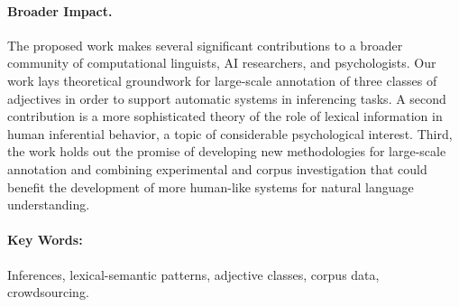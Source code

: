 \documentclass[10pt]{article}
\begin{document}
\paragraph{Broader Impact.}
The proposed work  makes several significant contributions to a broader community of computational linguists, AI researchers, and psychologists. 
Our work lays theoretical groundwork for large-scale annotation of three classes of adjectives in order to support automatic systems in inferencing tasks. 
A second contribution is a more sophisticated theory of the role of lexical information in human inferential behavior, a topic of considerable psychological interest.
Third, the work holds out the promise of developing new methodologies for large-scale annotation and combining experimental and corpus investigation that could benefit the development of more human-like systems for natural language understanding.


\vspace{-1.2em}


\paragraph{Key Words:} Inferences, lexical-semantic patterns, adjective classes, corpus data, crowdsourcing. 
\end{document}
